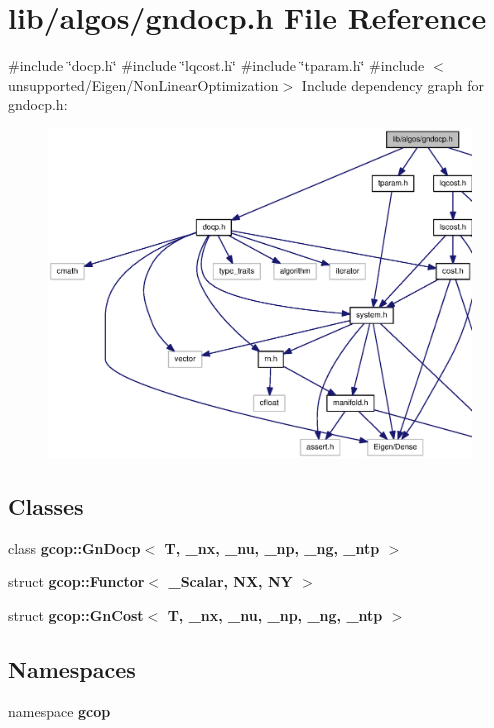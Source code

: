 \section{lib/algos/gndocp.h \-File \-Reference}
\label{gndocp_8h}
{\ttfamily \#include \char`\"{}docp.\-h\char`\"{}}\*
{\ttfamily \#include \char`\"{}lqcost.\-h\char`\"{}}\*
{\ttfamily \#include \char`\"{}tparam.\-h\char`\"{}}\*
{\ttfamily \#include $<$unsupported/\-Eigen/\-Non\-Linear\-Optimization$>$}\*
\-Include dependency graph for gndocp.\-h\-:\nopagebreak
\begin{figure}[H]
\begin{center}
\leavevmode
\includegraphics[width=350pt]{gndocp_8h__incl}
\end{center}
\end{figure}
\subsection*{\-Classes}
\begin{DoxyCompactItemize}
\item 
class {\bf gcop\-::\-Gn\-Docp$<$ T, \-\_\-nx, \-\_\-nu, \-\_\-np, \-\_\-ng, \-\_\-ntp $>$}
\item 
struct {\bf gcop\-::\-Functor$<$ \-\_\-\-Scalar, N\-X, N\-Y $>$}
\item 
struct {\bf gcop\-::\-Gn\-Cost$<$ T, \-\_\-nx, \-\_\-nu, \-\_\-np, \-\_\-ng, \-\_\-ntp $>$}
\end{DoxyCompactItemize}
\subsection*{\-Namespaces}
\begin{DoxyCompactItemize}
\item 
namespace {\bf gcop}
\end{DoxyCompactItemize}
